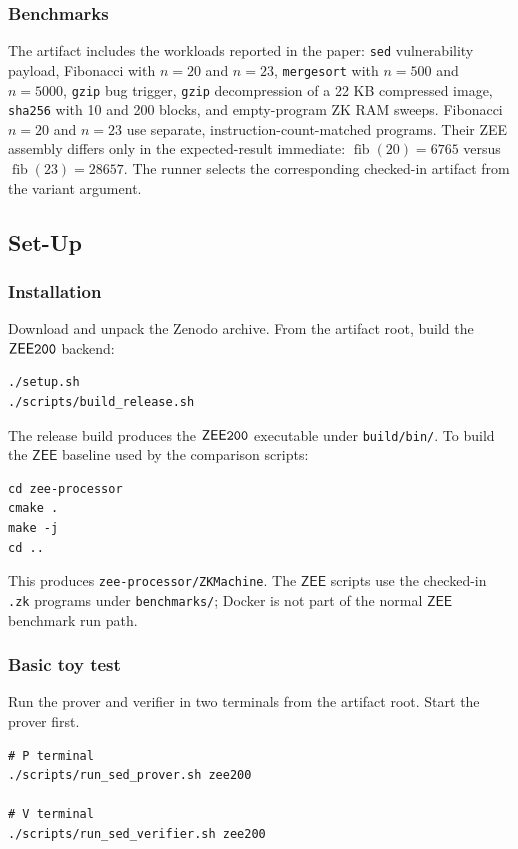 \documentclass[nonacm,sigconf]{acmart}
\newcommand{\oursystem}{$\mathsf{ZEE}\tt{200}$\xspace}
\newcommand{\zee}[0]{\ensuremath{\mathsf{ZEE}}\xspace}
\begin{document}
\subsubsection{Benchmarks}

The artifact includes the workloads reported in the paper:
\texttt{sed} vulnerability payload, Fibonacci with $n=20$ and $n=23$,
\texttt{mergesort} with $n=500$ and $n=5000$, \texttt{gzip} bug
trigger, \texttt{gzip} decompression of a 22 KB compressed image,
\texttt{sha256} with 10 and 200 blocks, and empty-program ZK RAM
sweeps.
Fibonacci $n=20$ and $n=23$ use separate, instruction-count-matched programs.
Their ZEE assembly differs only in the expected-result immediate:
$\operatorname{fib}(20)=6765$ versus $\operatorname{fib}(23)=28657$.
The runner selects the corresponding checked-in artifact from the variant argument.

\subsection{Set-Up}

\subsubsection{Installation}

Download and unpack the Zenodo archive. From the artifact root, build
the \oursystem backend:
\begin{verbatim}
./setup.sh
./scripts/build_release.sh
\end{verbatim}

The release build produces the \oursystem executable under
\texttt{build/bin/}. To build the \zee baseline used by the comparison
scripts:
\begin{verbatim}
cd zee-processor
cmake .
make -j
cd ..
\end{verbatim}

This produces \texttt{zee-processor/ZKMachine}. The \zee scripts use
the checked-in \texttt{.zk} programs under \texttt{benchmarks/}; Docker
is not part of the normal \zee benchmark run path.

\subsubsection{Basic toy test}

Run the prover and verifier in two terminals from the artifact root.
Start the prover first.
\begin{verbatim}
# P terminal
./scripts/run_sed_prover.sh zee200

# V terminal
./scripts/run_sed_verifier.sh zee200
\end{verbatim}
\end{document}
